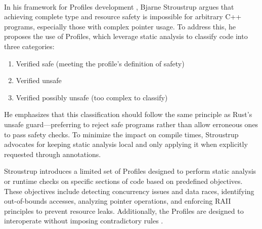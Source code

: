 \paragraph{}

In his framework for Profiles development \cite[]{stroustrupFrameworkProfilesDevelopment}, Bjarne Stroustrup argues that achieving complete type and resource safety is impossible for arbitrary C++ programs, especially those with complex pointer usage. To address this, he proposes the use of Profiles, which leverage static analysis to classify code into three categories:

\begin{enumerate}[noitemsep] 
    \item Verified safe (meeting the profile's definition of safety) 
    \item Verified unsafe 
    \item Verified possibly unsafe (too complex to classify) 
\end{enumerate}

He emphasizes that this classification should follow the same principle as Rust's unsafe guard—preferring to reject safe programs rather than allow erroneous ones to pass safety checks. To minimize the impact on compile times, Stroustrup advocates for keeping static analysis local and only applying it when explicitly requested through annotations.

Stroustrup introduces a limited set of Profiles designed to perform static analysis or runtime checks on specific sections of code based on predefined objectives. These objectives include detecting concurrency issues and data races, identifying out-of-bounds accesses, analyzing pointer operations, and enforcing RAII principles to prevent resource leaks. Additionally, the Profiles are designed to interoperate without imposing contradictory rules \cite[]{stroustrupFrameworkProfilesDevelopment}.


